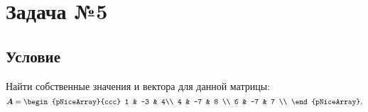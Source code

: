\documentclass[12pt, a4paper]{article}
\renewcommand{\vec}[1]{\text{\mathversion{bold}${#1}$}}%
\begin{document}
		
	\newpage
	\section{Задача №5}
		\subsection*{Условие}
		Найти собственные значения и вектора для данной матрицы:
		\begin{equation*}
			\vec A =
			\begin{pNiceArray}{ccc}
				1 & -3 & 4\\
				4 & -7 & 8 \\
				6 & -7 & 7 \\
			\end{pNiceArray},
		\end{equation*}
		
\end{document}
